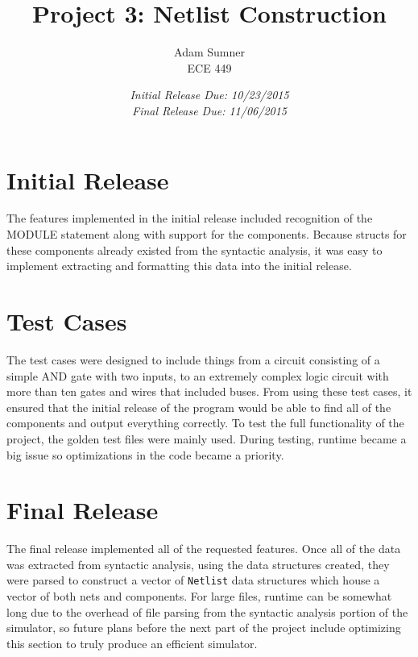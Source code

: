 \documentclass[12pt]{article}
\title{\textbf{Project 3: Netlist Construction}}
\author{Adam Sumner\\ECE 449}
\date{\textit{Initial Release Due: 10/23/2015}\\ \textit{Final Release Due: 11/06/2015}}
\begin{document}
\maketitle

\section{Initial Release}
The features implemented in the initial release included recognition of the MODULE statement along with support for the components. Because structs for these components already existed from the syntactic analysis, it was easy to implement extracting and formatting this data into the initial release.


\section{Test Cases}
The test cases were designed to include things from a circuit consisting of a simple AND gate with two inputs, to an extremely complex logic circuit with more than ten gates and wires that included buses. From using these test cases, it ensured that the initial release of the program would be able to find all of the components and output everything correctly. To test the full functionality of the project, the golden test files were mainly used. During testing, runtime became a big issue so optimizations in the code became a priority.

\section{Final Release}
The final release implemented all of the requested features. Once all of the data was extracted from syntactic analysis, using the data structures created, they were parsed to construct a vector of \texttt{Netlist} data structures which house a vector of both nets and components. For large files, runtime can be somewhat long due to the overhead of file parsing from the syntactic analysis portion of the simulator, so future plans before the next part of the project include optimizing this section to truly produce an efficient simulator. 
\end{document}
